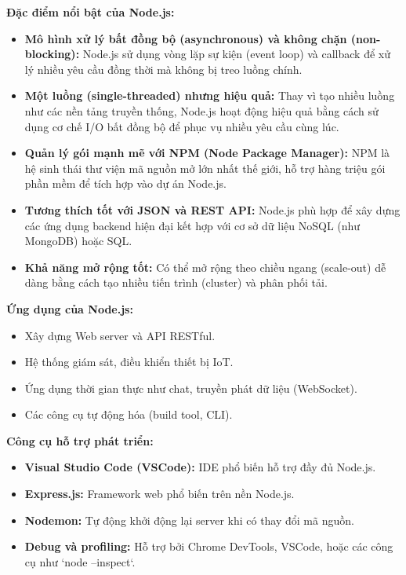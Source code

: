 \textbf{Đặc điểm nổi bật của Node.js:}
\begin{itemize}
    \item \textbf{Mô hình xử lý bất đồng bộ (asynchronous) và không chặn (non-blocking):} Node.js sử dụng vòng lặp sự kiện (event loop) và callback để xử lý nhiều yêu cầu đồng thời mà không bị treo luồng chính.
    
    \item \textbf{Một luồng (single-threaded) nhưng hiệu quả:} Thay vì tạo nhiều luồng như các nền tảng truyền thống, Node.js hoạt động hiệu quả bằng cách sử dụng cơ chế I/O bất đồng bộ để phục vụ nhiều yêu cầu cùng lúc.

    \item \textbf{Quản lý gói mạnh mẽ với NPM (Node Package Manager):} NPM là hệ sinh thái thư viện mã nguồn mở lớn nhất thế giới, hỗ trợ hàng triệu gói phần mềm để tích hợp vào dự án Node.js.

    \item \textbf{Tương thích tốt với JSON và REST API:} Node.js phù hợp để xây dựng các ứng dụng backend hiện đại kết hợp với cơ sở dữ liệu NoSQL (như MongoDB) hoặc SQL.

    \item \textbf{Khả năng mở rộng tốt:} Có thể mở rộng theo chiều ngang (scale-out) dễ dàng bằng cách tạo nhiều tiến trình (cluster) và phân phối tải.
\end{itemize}

\textbf{Ứng dụng của Node.js:}
\begin{itemize}
    \item Xây dựng Web server và API RESTful.
    \item Hệ thống giám sát, điều khiển thiết bị IoT.
    \item Ứng dụng thời gian thực như chat, truyền phát dữ liệu (WebSocket).
    \item Các công cụ tự động hóa (build tool, CLI).
\end{itemize}

\textbf{Công cụ hỗ trợ phát triển:}
\begin{itemize}
    \item \textbf{Visual Studio Code (VSCode):} IDE phổ biến hỗ trợ đầy đủ Node.js.
    \item \textbf{Express.js:} Framework web phổ biến trên nền Node.js.
    \item \textbf{Nodemon:} Tự động khởi động lại server khi có thay đổi mã nguồn.
    \item \textbf{Debug và profiling:} Hỗ trợ bởi Chrome DevTools, VSCode, hoặc các công cụ như `node --inspect`.
\end{itemize}

